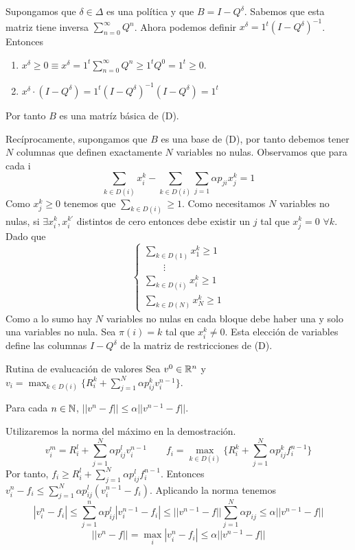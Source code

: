 \documentclass[MIOP.tex]{subfiles}
\begin{document}
\begin{dem}
Supongamos que $\delta \in \Delta$ es una política y que $B= I-Q^\delta$. Sabemos que esta matriz tiene inversa $\sum_{n=0}^\infty Q^n$. Ahora podemos definir $x^\delta = 1^t(I-Q^\delta)^{-1}$. Entonces
\begin{enumerate}
\item $x^\delta \geq0 \equiv x^\delta = 1^t \sum_{n=0}^\infty Q^n \geq 1^t Q^0 = 1^t \geq 0$.
\item $x^\delta \cdot (I-Q^\delta) = 1^t (I-Q^\delta)^{-1}(I-Q^\delta) = 1^t$
\end{enumerate}
Por tanto $B$ es una matríz básica de (D).

Recíprocamente, supongamos que $B$ es una base de (D), por tanto debemos tener $N$ columnas que definen exactamente $N$ variables no nulas. Observamos que para cada i
$$
\sum_{k\in D(i)}x^k_i - \sum_{k\in D(i)}\sum_{j=1} \alpha p_{ji} x_j^k = 1
$$
Como $x_j^k\geq 0$ tenemos que $\sum_{k\in D(i)} \geq 1$. Como necesitamos $N$ variables no nulas, si $\exists x_i^k, x_i^{k'}$ distintos de cero entonces debe existir un $j$ tal que $x_j^k = 0$ $\forall k$. Dado que
$$
\begin{cases}
\sum_{k\in D(1)} x_1^k \geq 1\\
\qquad\vdots\\
\sum_{k\in D(i)} x_i^k \geq 1\\
\sum_{k\in D(N)} x_N^k \geq 1
\end{cases}
$$
Como a lo sumo hay $N$ variables no nulas en cada bloque debe haber una y solo una variables no nula. Sea $\pi(i)=k$ tal que $x_i^k\neq0$. Esta elección de variables define las columnas $I-Q^\delta$ de la matriz de restricciones de (D). 
\end{dem}
Rutina de evalucación de valores
Sea $v^0\in \mathbb{R}^n$ y $v_i = \max_{k\in D(i)}  \{R_i^k + \sum_{j=1}^N \alpha p_{ij}^k v_i^{n-1}\}$.
\begin{teorema}
Para cada $n\in\mathbb{N}$, $||v^n-f||\leq \alpha||v^{n-1}-f||$.  
\end{teorema}
\begin{dem}
Utilizaremos la norma del máximo en la demostración. 
$$
v_i^m = R_i^l + \sum_{j=1}^N \alpha p_{ij}^l v_i^{n-1}
\qquad
f_i = \max_{k\in D(i)}  \{R_i^k + \sum_{j=1}^N \alpha p_{ij}^k f_i^{n-1}\}
$$
Por tanto, $f_i \geq R_i^l + \sum_{j=1}^N \alpha p_{ij}^l f_i^{n-1}$. Entonces $v_i^n-f_i \leq \sum_{j=1}^N \alpha p_{ij}^l(v_i^{n-1}-f_i)$. Aplicando la norma tenemos
$$
|v^n_i-f_i| \leq \sum_{j=1}^n \alpha p_{ij}^l |v_i^{n-1}-f_i| \leq ||v^{n-1}-f|| \sum_{j=1}^N \alpha p_{ij} \leq \alpha||v^{n-1}-f||$$
$$
||v^n-f|| = \max_i |v_i^n - f_i| \leq \alpha ||v^{n-1}-f||
$$
\end{dem}
\end{document}
